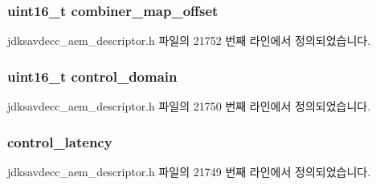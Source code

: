 \subsubsection[{\texorpdfstring{combiner\+\_\+map\+\_\+offset}{combiner_map_offset}}]{\setlength{\rightskip}{0pt plus 5cm}uint16\+\_\+t combiner\+\_\+map\+\_\+offset}\hypertarget{structjdksavdecc__descriptor__signal__combiner_abc173ec56f2573ff69cf569647ddcfe8}{}\label{structjdksavdecc__descriptor__signal__combiner_abc173ec56f2573ff69cf569647ddcfe8}


jdksavdecc\+\_\+aem\+\_\+descriptor.\+h 파일의 21752 번째 라인에서 정의되었습니다.

\subsubsection[{\texorpdfstring{control\+\_\+domain}{control_domain}}]{\setlength{\rightskip}{0pt plus 5cm}uint16\+\_\+t control\+\_\+domain}\hypertarget{structjdksavdecc__descriptor__signal__combiner_a8937b22996b7c28ae209f29fe777f03a}{}\label{structjdksavdecc__descriptor__signal__combiner_a8937b22996b7c28ae209f29fe777f03a}


jdksavdecc\+\_\+aem\+\_\+descriptor.\+h 파일의 21750 번째 라인에서 정의되었습니다.

\subsubsection[{\texorpdfstring{control\+\_\+latency}{control_latency}}]{ control\+\_\+latency}\hypertarget{structjdksavdecc__descriptor__signal__combiner_ab2bd4639caaf9a8078b68368afbd63b6}{}\label{structjdksavdecc__descriptor__signal__combiner_ab2bd4639caaf9a8078b68368afbd63b6}


jdksavdecc\+\_\+aem\+\_\+descriptor.\+h 파일의 21749 번째 라인에서 정의되었습니다.

